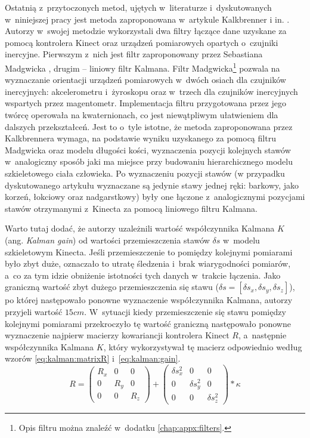 Ostatnią z~przytoczonych metod, ujętych w~literaturze i~dyskutowanych w~niniejszej pracy jest metoda zaproponowana w~artykule Kalkbrenner i in. \cite{Kalkbrenner2014}. Autorzy w~swojej metodzie wykorzystali dwa filtry łączące dane uzyskane za pomocą kontrolera Kinect oraz urządzeń pomiarowych opartych o~czujniki inercyjne. Pierwszym z~nich jest filtr zaproponowany przez Sebastiana Madgwicka \cite{Kalkbrenner2014}, drugim -- liniowy filtr Kalmana. Filtr Madgwicka\footnote{Opis filtru można znaleźć w~dodatku \ref{chap:appx:filters}.} pozwala na wyznaczanie orientacji urządzeń pomiarowych w~dwóch osiach dla czujników inercyjnych: akcelerometru i~żyroskopu oraz w~trzech dla czujników inercyjnych wspartych przez magentometr. Implementacja filtru przygotowana przez jego twórcę operowała na kwaternionach, co jest niewątpliwym ułatwieniem dla dalszych przekształceń. Jest to o~tyle istotne, że metoda zaproponowana przez Kalkbrennera wymaga, na podstawie wyniku uzyskanego za pomocą filtru Madgwicka oraz modelu długości kości, wyznaczenia pozycji kolejnych stawów  w~analogiczny sposób jaki ma miejsce przy budowaniu hierarchicznego modelu szkieletowego ciała człowieka. Po wyznaczeniu pozycji stawów (w przypadku dyskutowanego artykułu wyznaczane są jedynie stawy jednej ręki: barkowy, jako korzeń, łokciowy oraz nadgarstkowy) były one łączone z~analogicznymi pozycjami stawów otrzymanymi z~Kinecta za pomocą liniowego filtru Kalmana. 
		
Warto tutaj dodać, że autorzy uzależnili wartość współczynnika Kalmana $K$ (ang. \emph{Kalman gain}) od wartości przemieszczenia stawów $\delta s$ w~modelu szkieletowym Kinecta. Jeśli przemieszczenie to pomiędzy kolejnymi pomiarami było zbyt duże, oznaczało to utratę śledzenia i~brak wiarygodności pomiarów, a~co za tym idzie obniżenie istotności tych danych w~trakcie łączenia. Jako graniczną wartość zbyt dużego przemieszczenia się stawu ($\delta s = [\delta s_x, \delta s_y, \delta s_z]$), po której następowało ponowne wyznaczenie współczynnika Kalmana, autorzy przyjeli wartość $15cm$. W~sytuacji kiedy przemieszczenie się stawu pomiędzy kolejnymi pomiarami przekroczyło tę wartość graniczną następowało ponowne wyznaczenie najpierw macierzy kowariancji kontrolera Kinect $R$, a~następnie współczynnika Kalmana $K$, który wykorzystywał tę macierz odpowiednio według wzorów \eqref{eq:kalman:matrixR} i~\eqref{eq:kalman:gain}.
\begin{equation}
	R = 
	\begin{pmatrix}
		R_x & 0   & 0   \\
		0   & R_y & 0   \\
		0   & 0   & R_z 
	\end{pmatrix} +
	\begin{pmatrix}
		\delta s_x^2 & 0            & 0            \\
		0            & \delta s_y^2 & 0            \\
		0            & 0            & \delta s_z^2 
	\end{pmatrix} * \kappa
	\label{eq:kalman:matrixR}
\end{equation}
		
